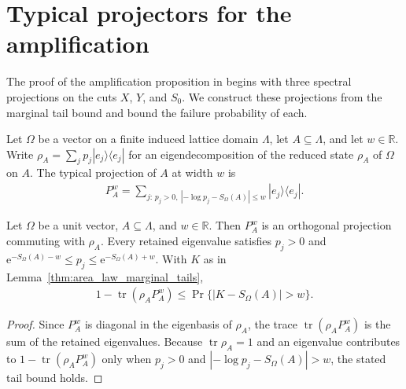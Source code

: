 
\section{Typical projectors for the amplification}

The proof of the amplification proposition in
\cite[Section~10]{OpenAI2026AreaLaw} begins with three spectral
projections on the cuts $X$, $Y$, and $S_0$. We construct these projections
from the marginal tail bound and bound the failure probability of each.

\begin{definition}
    \label{def:al_amp_typical_projection}
    \leanok
    Let $\Omega$ be a vector on a finite induced lattice domain $\Lambda$,
    let $A\subseteq\Lambda$, and let $w\in\mathbb R$. Write
    $\rho_A=\sum_jp_j|e_j\rangle\langle e_j|$ for an eigendecomposition
    of the reduced state $\rho_A$ of $\Omega$ on $A$. The typical projection
    of $A$ at width $w$ is
    \begin{align*}
        P_A^w=\sum_{j:\,p_j>0,\ |-\log p_j-S_\Omega(A)|\le w}
        |e_j\rangle\langle e_j|.
    \end{align*}
\end{definition}

\begin{lemma}
    \label{thm:al_amp_typical_projection_cut}
    \leanok
    Let $\Omega$ be a unit vector, $A\subseteq\Lambda$, and $w\in\mathbb R$.
    Then $P_A^w$ is an orthogonal projection commuting with $\rho_A$. Every
    retained eigenvalue satisfies $p_j>0$ and
    $\mathrm e^{-S_\Omega(A)-w}\le p_j\le\mathrm e^{-S_\Omega(A)+w}$.
    With $K$ as in Lemma~\ref{thm:area_law_marginal_tails},
    \begin{align*}
        1-\operatorname{tr}(\rho_AP_A^w)\le\Pr\{|K-S_\Omega(A)|>w\}.
    \end{align*}
\end{lemma}
\begin{proof}\leanok
    Since $P_A^w$ is diagonal in the eigenbasis of $\rho_A$, the trace
    $\operatorname{tr}(\rho_AP_A^w)$ is the sum of the retained
    eigenvalues. Because $\operatorname{tr}\rho_A=1$ and an eigenvalue
    contributes to $1-\operatorname{tr}(\rho_AP_A^w)$ only when $p_j>0$
    and $|-\log p_j-S_\Omega(A)|>w$, the stated tail bound holds.
\end{proof}

